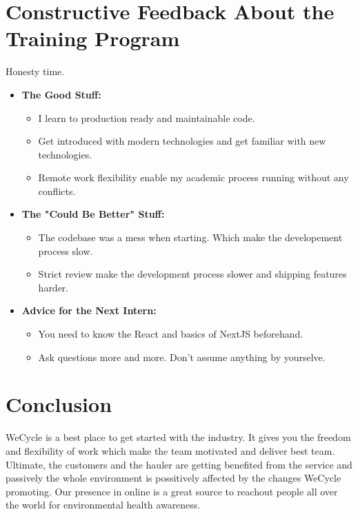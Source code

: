 \section{Constructive Feedback About the Training Program}
\par Honesty time.
\begin{itemize}
    \item \textbf{The Good Stuff:}
    \begin{itemize}
        \item I learn to production ready and maintainable code.
        \item Get introduced with modern technologies and get familiar with new technologies.
        \item Remote work flexibility enable my academic process running without any conflicts.
    \end{itemize}
    \item \textbf{The "Could Be Better" Stuff:}
    \begin{itemize}
        \item The codebase was a mess when starting. Which make the developement process slow.
        \item Strict review make the development process slower and shipping features harder.
    \end{itemize}
    \item \textbf{Advice for the Next Intern:}
    \begin{itemize}
        \item You need to know the React and basics of NextJS beforehand.
        \item Ask questions more and more. Don't assume anything by yourselve.
    \end{itemize}
\end{itemize}

\section{Conclusion}
\par WeCycle is a best place to get started with the industry. It gives you the freedom and flexibility of work which make the team motivated and deliver best team. Ultimate, the customers and the hauler are getting benefited from the service and passively the whole environment is possitively affected by the changes WeCycle promoting. Our presence in online is a great source to reachout people all over the world for environmental health awareness.    